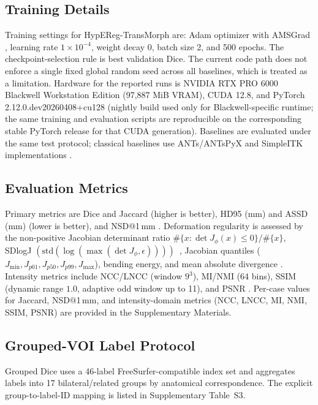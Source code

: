 \documentclass[jimaging,article,submit,pdftex,moreauthors]{Definitions/mdpi}
\begin{document}
\subsection{Training Details}
Training settings for HypEReg-TransMorph are: Adam optimizer with AMSGrad \cite{kingma2014adam,reddi2018amsgrad}, learning rate \(1\times10^{-4}\), weight decay \(0\), batch size 2, and 500 epochs. The checkpoint-selection rule is best validation Dice. The current code path does not enforce a single fixed global random seed across all baselines, which is treated as a limitation. Hardware for the reported runs is NVIDIA RTX PRO 6000 Blackwell Workstation Edition (97,887 MiB VRAM), CUDA 12.8, and PyTorch 2.12.0.dev20260408+cu128 (nightly build used only for Blackwell-specific runtime; the same training and evaluation scripts are reproducible on the corresponding stable PyTorch release for that CUDA generation). Baselines are evaluated under the same test protocol; classical baselines use ANTs/ANTsPyX and SimpleITK implementations \cite{avants2008ants,antspyx2024,simpleitk2013}.

\subsection{Evaluation Metrics}
Primary metrics are Dice and Jaccard (higher is better), HD95 (mm) and ASSD (mm) (lower is better), and NSD@1\,mm \cite{dice1945,heimann2009}. Deformation regularity is assessed by the non-positive Jacobian determinant ratio \(\#\{x:\det J_\phi(x)\le 0\}/\#\{x\}\), SDlogJ \(\left(\mathrm{std}(\log(\max(\det J_\phi,\epsilon)))\right)\)~\cite{hering2023learn2reg}, Jacobian quantiles (\(J_{\min}, J_{p01}, J_{p50}, J_{p99}, J_{\max}\)), bending energy, and mean absolute divergence \cite{bookstein1989tps,mok2020lapirn}. Intensity metrics include NCC/LNCC (window \(9^3\)), MI/NMI (64 bins), SSIM (dynamic range \(1.0\), adaptive odd window up to 11), and PSNR \cite{studholme1999nmi,wang2004ssim}. Per-case values for Jaccard, NSD@1\,mm, and intensity-domain metrics (NCC, LNCC, MI, NMI, SSIM, PSNR) are provided in the Supplementary Materials.

\subsection{Grouped-VOI Label Protocol}
Grouped Dice uses a 46-label FreeSurfer-compatible index set and aggregates labels into 17 bilateral/related groups by anatomical correspondence. The explicit group-to-label-ID mapping is listed in Supplementary Table~S3.
\end{document}
